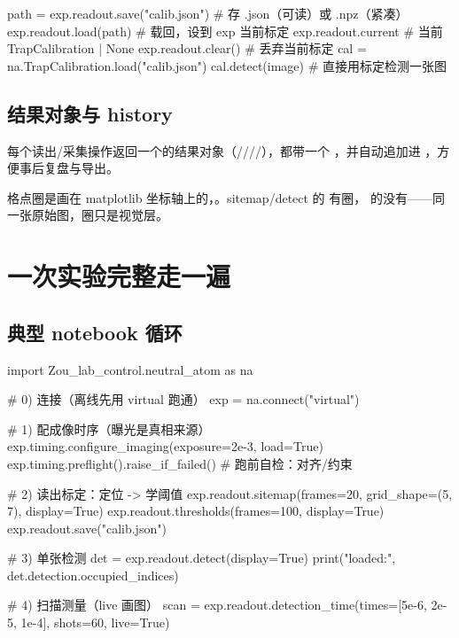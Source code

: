 \documentclass[11pt,oneside,openany]{book}
\begin{document}
\begin{codeblock}[Python]
path = exp.readout.save("calib.json")     # 存 .json（可读）或 .npz（紧凑）
exp.readout.load(path)                     # 载回，设到 exp 当前标定
exp.readout.current                        # 当前 TrapCalibration | None
exp.readout.clear()                        # 丢弃当前标定
cal = na.TrapCalibration.load("calib.json")
cal.detect(image)                          # 直接用标定检测一张图
\end{codeblock}

\section{结果对象与 history}
每个读出/采集操作返回一个的结果对象（////），都带一个 ，并自动追加进 ，方便事后复盘与导出。

\begin{notebox}[叠加是非破坏性的]
格点圈是画在 matplotlib 坐标轴上的，。sitemap/detect 的  有圈， 的没有——同一张原始图，圈只是视觉层。
\end{notebox}

\chapter{一次实验完整走一遍}

\section{典型 notebook 循环}
\begin{codeblock}[Python]
import Zou_lab_control.neutral_atom as na

# 0) 连接（离线先用 virtual 跑通）
exp = na.connect("virtual")

# 1) 配成像时序（曝光是真相来源）
exp.timing.configure_imaging(exposure=2e-3, load=True)
exp.timing.preflight().raise_if_failed()        # 跑前自检：对齐/约束

# 2) 读出标定：定位 -> 学阈值
exp.readout.sitemap(frames=20, grid_shape=(5, 7), display=True)
exp.readout.thresholds(frames=100, display=True)
exp.readout.save("calib.json")

# 3) 单张检测
det = exp.readout.detect(display=True)
print("loaded:", det.detection.occupied_indices)

# 4) 扫描测量（live 画图）
scan = exp.readout.detection_time(times=[5e-6, 2e-5, 1e-4], shots=60, live=True)
\end{codeblock}
\end{document}
